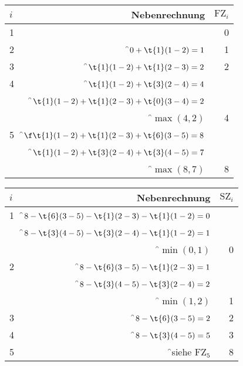 \documentclass{lehramt-informatik-aufgabe}
\begin{document}
\begin{enumerate}
\begin{antwort}
\begin{tabular}{|l|r|r|}
\hline
$i$ & Nebenrechnung & $\text{FZ}_i$\\
\hline\hline
1             &                                                & 0 \\\hline
2             & \f$0 + \t{1}(1-2) = 1$                         & 1 \\\hline
3             & \f$\t{1}(1-2) + \t{1}(2-3) = 2$                & 2 \\\hline
4             & \f$\t{1}(1-2) + \t{3}(2-4) = 4$                & \\
              & \f$\t{1}(1-2) + \t{1}(2-3) + \t{0}(3-4) = 2$   & \\
              & \f$\max(4,2)$                                  & 4 \\\hline
5             & \f$\f\t{1}(1-2) + \t{1}(2-3) + \t{6}(3-5) = 8$ & \\
              & \f$\t{1}(1-2) + \t{3}(2-4) + \t{3}(4-5) = 7$   & \\
              & \f$\max(8,7)$                                  & 8 \\\hline
\end{tabular}

%


\begin{tabular}{|l|r|r|}
\hline
$i$ & Nebenrechnung & $\text{SZ}_i$\\
\hline\hline
1             & \f$8 - \t{6}(3-5) - \t{1}(2-3) - \t{1}(1-2) = 0$ & \\
              & \f$8 - \t{3}(4-5) - \t{3}(2-4) - \t{1}(1-2) = 1$ & \\
              & \f$\min(0,1)$ & 0 \\\hline

2             & \f$8 - \t{6}(3-5) - \t{1}(2-3) = 1$ & \\
              & \f$8 - \t{3}(4-5) - \t{3}(2-4) = 2$ & \\
              & \f$\min(1,2)$ & 1 \\\hline

3             & \f$8 - \t{6}(3-5) = 2$ & 2  \\\hline

4             & \f$8 - \t{3}(4-5) = 5$      & 3 \\\hline
5             & \f{}siehe $\text{FZ}_5$  & 8 \\\hline
\end{tabular}
\end{antwort}


\end{enumerate}
\end{document}
